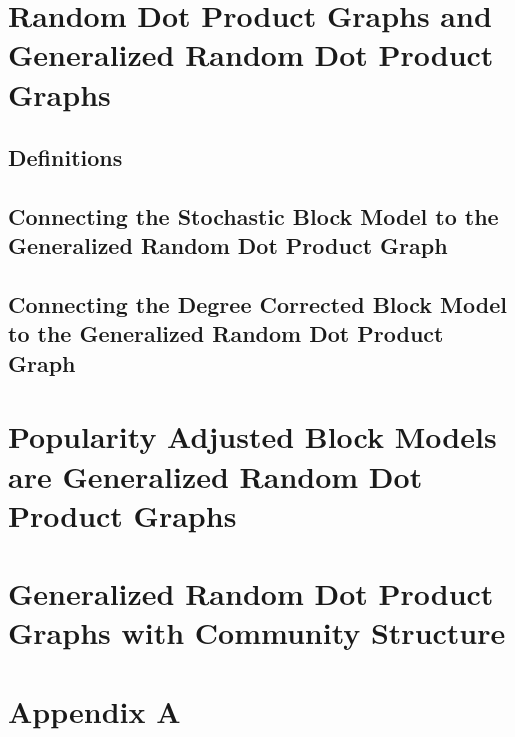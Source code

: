\documentclass[
  11pt,
]{article}
\begin{document}
\newpage

\hypertarget{random-dot-product-graphs-and-generalized-random-dot-product-graphs}{%
\section{Random Dot Product Graphs and Generalized Random Dot Product
Graphs}\label{random-dot-product-graphs-and-generalized-random-dot-product-graphs}}

\hypertarget{definitions}{%
\subsection{Definitions}\label{definitions}}

\hypertarget{connecting-the-stochastic-block-model-to-the-generalized-random-dot-product-graph}{%
\subsection{Connecting the Stochastic Block Model to the Generalized
Random Dot Product
Graph}\label{connecting-the-stochastic-block-model-to-the-generalized-random-dot-product-graph}}

\hypertarget{connecting-the-degree-corrected-block-model-to-the-generalized-random-dot-product-graph}{%
\subsection{Connecting the Degree Corrected Block Model to the
Generalized Random Dot Product
Graph}\label{connecting-the-degree-corrected-block-model-to-the-generalized-random-dot-product-graph}}

\newpage

\hypertarget{popularity-adjusted-block-models-are-generalized-random-dot-product-graphs}{%
\section{Popularity Adjusted Block Models are Generalized Random Dot
Product
Graphs}\label{popularity-adjusted-block-models-are-generalized-random-dot-product-graphs}}

\newpage

\hypertarget{generalized-random-dot-product-graphs-with-community-structure}{%
\section{Generalized Random Dot Product Graphs with Community
Structure}\label{generalized-random-dot-product-graphs-with-community-structure}}

\newpage

\section*{Appendix A}

\newpage

\renewcommand\refname{References}
  
\end{document}
